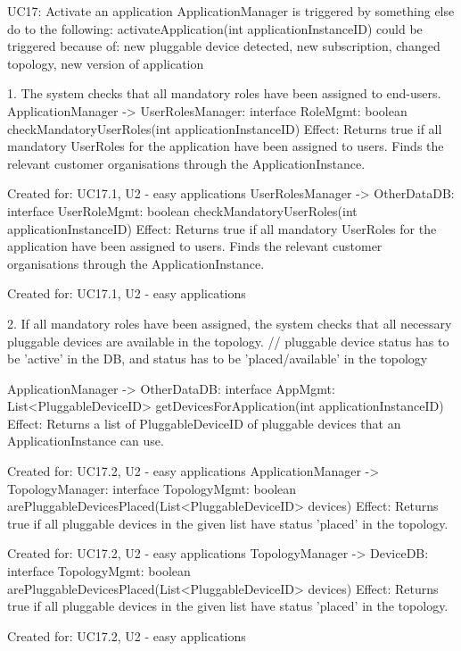 {{{        UC17: Activate an application
            ApplicationManager is triggered by something else do to the following: activateApplication(int applicationInstanceID)
            could be triggered because of: new pluggable device detected, new subscription, changed topology, new version of application

            1. The system checks that all mandatory roles have been assigned to end-users.
                ApplicationManager -> UserRolesManager: interface RoleMgmt:     boolean checkMandatoryUserRoles(int applicationInstanceID)
                    Effect: Returns true if all mandatory UserRoles for the application have been assigned to users. Finds the relevant customer organisations through the ApplicationInstance.
                    \item Created for: UC17.1, U2 - easy applications
                UserRolesManager -> OtherDataDB:        interface UserRoleMgmt: boolean checkMandatoryUserRoles(int applicationInstanceID)
                    Effect: Returns true if all mandatory UserRoles for the application have been assigned to users. Finds the relevant customer organisations through the ApplicationInstance.
                    \item Created for: UC17.1, U2 - easy applications

            2. If all mandatory roles have been assigned, the system checks that all necessary pluggable devices are available in the topology.
                // pluggable device status has to be 'active' in the DB, and status has to be 'placed/available' in the topology

                ApplicationManager -> OtherDataDB:     interface AppMgmt:       List<PluggableDeviceID> getDevicesForApplication(int applicationInstanceID)
                    Effect: Returns a list of PluggableDeviceID of pluggable devices that an ApplicationInstance can use.
                    \item Created for: UC17.2, U2 - easy applications
                ApplicationManager -> TopologyManager: interface TopologyMgmt:  boolean arePluggableDevicesPlaced(List<PluggableDeviceID> devices)
                    Effect: Returns true if all pluggable devices in the given list have status 'placed' in the topology.
                    \item Created for: UC17.2, U2 - easy applications
                TopologyManager -> DeviceDB:           interface TopologyMgmt:  boolean arePluggableDevicesPlaced(List<PluggableDeviceID> devices)
                    Effect: Returns true if all pluggable devices in the given list have status 'placed' in the topology.
                    \item Created for: UC17.2, U2 - easy applications

}}}
